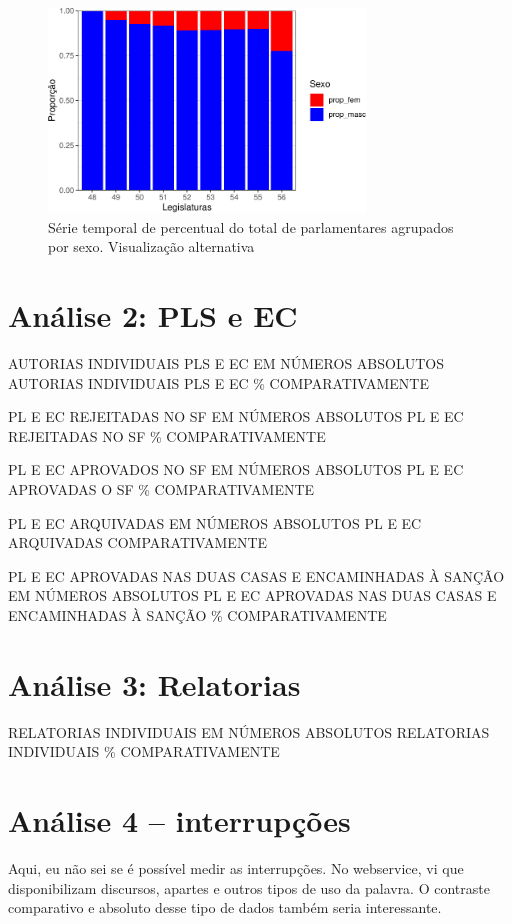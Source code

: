 \documentclass[
  letterpaper,
  DIV=11,
  numbers=noendperiod]{scrartcl}
\begin{document}
\begin{figure}

{\centering \includegraphics[width=0.75\textwidth,height=\textheight]{caderno-isabela_files/figure-pdf/plot-percentuais-parlamentares-alt-1.pdf}

}

\caption{Série temporal de percentual do total de parlamentares
agrupados por sexo. Visualização alternativa}

\end{figure}

\newpage{}

\hypertarget{anuxe1lise-2-pls-e-ec}{%
\section{Análise 2: PLS e EC}\label{anuxe1lise-2-pls-e-ec}}

AUTORIAS INDIVIDUAIS PLS E EC EM NÚMEROS ABSOLUTOS AUTORIAS INDIVIDUAIS
PLS E EC \% COMPARATIVAMENTE

PL E EC REJEITADAS NO SF EM NÚMEROS ABSOLUTOS PL E EC REJEITADAS NO SF
\% COMPARATIVAMENTE

PL E EC APROVADOS NO SF EM NÚMEROS ABSOLUTOS PL E EC APROVADAS O SF \%
COMPARATIVAMENTE

PL E EC ARQUIVADAS EM NÚMEROS ABSOLUTOS PL E EC ARQUIVADAS
COMPARATIVAMENTE

PL E EC APROVADAS NAS DUAS CASAS E ENCAMINHADAS À SANÇÃO EM NÚMEROS
ABSOLUTOS PL E EC APROVADAS NAS DUAS CASAS E ENCAMINHADAS À SANÇÃO \%
COMPARATIVAMENTE

\newpage{}

\hypertarget{anuxe1lise-3-relatorias}{%
\section{Análise 3: Relatorias}\label{anuxe1lise-3-relatorias}}

RELATORIAS INDIVIDUAIS EM NÚMEROS ABSOLUTOS RELATORIAS INDIVIDUAIS \%
COMPARATIVAMENTE

\newpage{}

\hypertarget{anuxe1lise-4-interrupuxe7uxf5es}{%
\section{Análise 4 --
interrupções}\label{anuxe1lise-4-interrupuxe7uxf5es}}

Aqui, eu não sei se é possível medir as interrupções. No webservice, vi
que disponibilizam discursos, apartes e outros tipos de uso da palavra.
O contraste comparativo e absoluto desse tipo de dados também seria
interessante.
\end{document}
